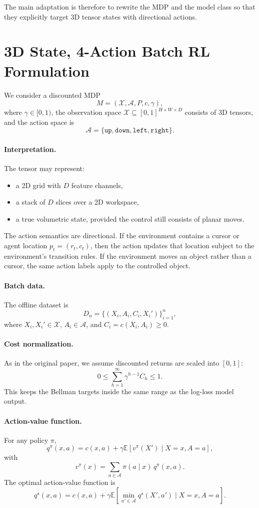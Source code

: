\documentclass[11pt]{article}
\newcommand{\A}{\mathcal{A}}
\newcommand{\X}{\mathcal{X}}
\newcommand{\E}{\mathbb{E}}
\newcommand{\up}{\texttt{up}}
\newcommand{\downa}{\texttt{down}}
\newcommand{\lefta}{\texttt{left}}
\newcommand{\righta}{\texttt{right}}
\begin{document}
The main adaptation is therefore to rewrite the MDP and the model class so that they explicitly target 3D tensor states with directional actions.

\section{3D State, 4-Action Batch RL Formulation}
We consider a discounted MDP
\[
M = (\X, \A, P, c, \gamma),
\]
where $\gamma \in [0,1)$, the observation space $\X \subseteq [0,1]^{H \times W \times D}$ consists of 3D tensors, and the action space is
\[
\A = \{\up, \downa, \lefta, \righta\}.
\]

\paragraph{Interpretation.}
The tensor may represent:
\begin{itemize}[leftmargin=*]
  \item a 2D grid with $D$ feature channels,
  \item a stack of $D$ slices over a 2D workspace,
  \item a true volumetric state, provided the control still consists of planar moves.
\end{itemize}
The action semantics are directional. If the environment contains a cursor or agent location $p_t = (r_t, c_t)$, then the action updates that location subject to the environment's transition rules. If the environment moves an object rather than a cursor, the same action labels apply to the controlled object.

\paragraph{Batch data.}
The offline dataset is
\[
D_n = \{(X_i, A_i, C_i, X_i')\}_{i=1}^n,
\]
where $X_i, X_i' \in \X$, $A_i \in \A$, and $C_i = c(X_i, A_i) \ge 0$.

\paragraph{Cost normalization.}
As in the original paper, we assume discounted returns are scaled into $[0,1]$:
\[
0 \le \sum_{h=1}^{\infty} \gamma^{h-1} C_h \le 1.
\]
This keeps the Bellman targets inside the same range as the log-loss model output.

\paragraph{Action-value function.}
For any policy $\pi$,
\[
q^\pi(x,a) = c(x,a) + \gamma \E[v^\pi(X') \mid X=x, A=a],
\]
with
\[
v^\pi(x) = \sum_{a \in \A} \pi(a \mid x)\, q^\pi(x,a).
\]
The optimal action-value function is
\[
q^\star(x,a) = c(x,a) + \gamma \E\left[\min_{a' \in \A} q^\star(X',a') \mid X=x, A=a\right].
\]
\end{document}
